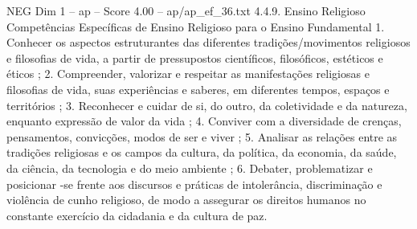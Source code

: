 \begin{textsample}{NEG Dim 1 – ap – Score 4.00 – ap/ap\_ef\_36.txt}  \label{ex:f1_neg_128}
4.4.9.
Ensino Religioso Competências Específicas de Ensino Religioso para o Ensino Fundamental 1.
Conhecer os aspectos estruturantes das diferentes tradições/movimentos religiosos e filosofias de vida, a partir de pressupostos científicos, filosóficos, estéticos e éticos ; 2.
Compreender, valorizar e respeitar as manifestações religiosas e filosofias de vida, suas experiências e saberes, em diferentes tempos, espaços e territórios ; 3.
Reconhecer e cuidar de si, do outro, da coletividade e da natureza, enquanto expressão de valor da vida ; 4.
Conviver com a diversidade de crenças, pensamentos, convicções, modos de ser e viver ; 5.
Analisar as relações entre as tradições religiosas e os campos da cultura, da política, da economia, da saúde, da ciência, da tecnologia e do meio ambiente ; 6.
Debater, problematizar e posicionar -se frente aos discursos e práticas de intolerância, discriminação e violência de cunho religioso, de modo a assegurar os direitos humanos no constante exercício da cidadania e da cultura de paz.

\end{textsample}
